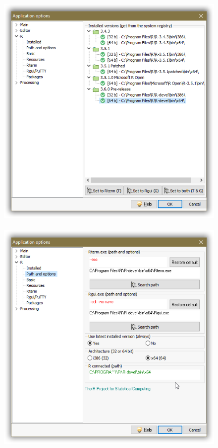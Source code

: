 \begin{figure}[h!]
  \includegraphics[scale=0.35]{./res/app_r_installed.png}~~
  \includegraphics[scale=0.35]{./res/app_r_pathandoptions.png}\\

\end{figure}
